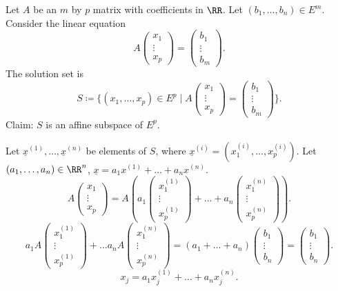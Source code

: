 \begin{exampleenv}
    Let $A$ be an $m$ by $p$ matrix with coefficients in $\RR$. Let $(b_1,\ldots,b_n)\in E^m$. Consider the linear equation
    $$ A\begin{pmatrix}
x_1\\
\vdots\\
x_p
\end{pmatrix}=\begin{pmatrix}
b_1\\
\vdots\\
b_m
\end{pmatrix}.$$
    The solution set is 
    $$S\coloneq \{(x_1,\dots,x_p)\in E^p\mid A \begin{pmatrix}
x_1\\
\vdots\\
x_p
\end{pmatrix}=\begin{pmatrix}
b_1\\
\vdots\\
b_m
\end{pmatrix}\}.$$
Claim: $S$ is an affine subspace of $E^p$.
\begin{proofenv}
    Let $\underline{x}^{(1)},\dots, \underline{x}^{(n)}$ be elements of $S$, where
    $\underline{x}^{(i)}=(x_1^{(i)},\dots,x_p^{(i)}).$
    Let $(a_1,\ldots,a_n)\in \RR^n$, $\underline{x}=a_1x^{(1)}+\dots+a_nx^{(n)}$.
    $$A\begin{pmatrix}
        x_1\\
        \vdots\\
        x_p
    \end{pmatrix}=A\left(a_1\begin{pmatrix}
        x_1^{(1)}\\
        \vdots\\
        x_p^{(1)}
    \end{pmatrix}+\dots+a_n\begin{pmatrix}
        x_1^{(n)}\\
        \vdots\\
        x_p^{(n)}
    \end{pmatrix}\right).$$
    $$a_1 A\begin{pmatrix}
        x_1^{(1)}\\
        \vdots\\
        x_p^{(1)}
    \end{pmatrix}+\dots a_n A\begin{pmatrix}
        x_1^{(n)}\\
        \vdots\\
        x_p^{(n)}
    \end{pmatrix}=(a_1+\dots+a_n)\begin{pmatrix}
        b_1\\
        \vdots\\
        b_n
    \end{pmatrix}=\begin{pmatrix}
        b_1\\
        \vdots\\
        b_n
    \end{pmatrix}.$$
    $$x_j=a_1x_j^{(1)}+\dots+a_n x_j^{(n)}.$$
\end{proofenv}
\end{exampleenv}

